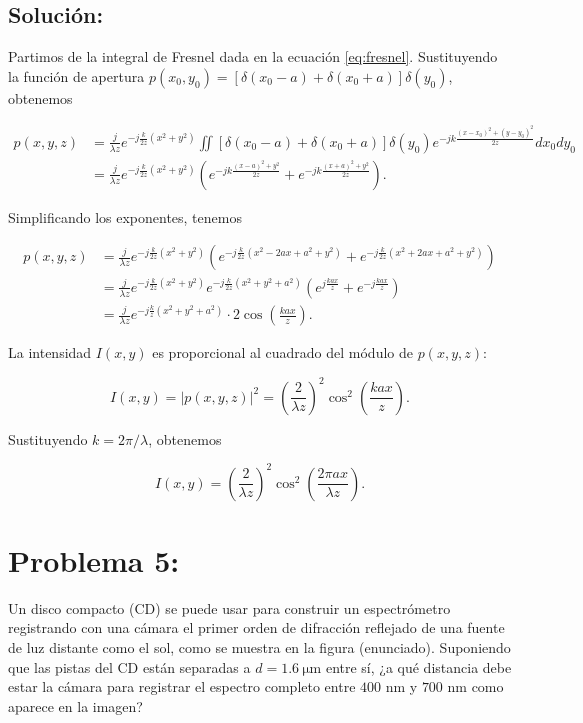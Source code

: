 \documentclass[11pt]{article}
\begin{document}
\subsection*{Solución:}

Partimos de la integral de Fresnel dada en la ecuación \eqref{eq:fresnel}. Sustituyendo la función de apertura \(p(x_0,y_0) = [\delta(x_0 - a) + \delta(x_0 + a)] \delta(y_0)\), obtenemos

\begin{align*}
p(x,y,z) &= \frac{j}{\lambda z} e^{-j\frac{k}{2z}(x^2+y^2)} \iint [\delta(x_0 - a) + \delta(x_0 + a)] \delta(y_0) e^{-jk\frac{(x - x_0)^2 + (y - y_0)^2}{2z}} dx_0 dy_0 \\
&= \frac{j}{\lambda z} e^{-j\frac{k}{2z}(x^2+y^2)} \left( e^{-jk\frac{(x - a)^2 + y^2}{2z}} + e^{-jk\frac{(x + a)^2 + y^2}{2z}} \right).
\end{align*}

Simplificando los exponentes, tenemos

\begin{align*}
p(x,y,z) &= \frac{j}{\lambda z} e^{-j\frac{k}{2z}(x^2+y^2)} \left( e^{-j\frac{k}{2z}(x^2 - 2ax + a^2 + y^2)} + e^{-j\frac{k}{2z}(x^2 + 2ax + a^2 + y^2)} \right) \\
&= \frac{j}{\lambda z} e^{-j\frac{k}{2z}(x^2+y^2)} e^{-j\frac{k}{2z}(x^2 + y^2 + a^2)} \left( e^{j\frac{ka x}{z}} + e^{-j\frac{ka x}{z}} \right) \\
&= \frac{j}{\lambda z} e^{-j\frac{k}{z}(x^2 + y^2 + a^2)} \cdot 2\cos\left(\frac{ka x}{z}\right).
\end{align*}

La intensidad \(I(x,y)\) es proporcional al cuadrado del módulo de \(p(x,y,z)\):

\[
I(x,y) = |p(x,y,z)|^2 = \left(\frac{2}{\lambda z}\right)^2 \cos^2\left(\frac{ka x}{z}\right).
\]

Sustituyendo \(k = 2\pi/\lambda\), obtenemos

\[
I(x,y) = \left(\frac{2}{\lambda z}\right)^2 \cos^2\left(\frac{2\pi a x}{\lambda z}\right).
\]

\section*{Problema 5:}

Un disco compacto (CD) se puede usar para construir un espectrómetro registrando con una cámara el primer orden de difracción reflejado de una fuente de luz distante como el sol, como se muestra en la figura (enunciado). Suponiendo que las pistas del CD están separadas a \(d=\SI{1.6}{\micro\metre}\) entre sí, ¿a qué distancia debe estar la cámara para registrar el espectro completo entre \(400\text{ nm}\) y \(700\text{ nm}\) como aparece en la imagen?
\end{document}
